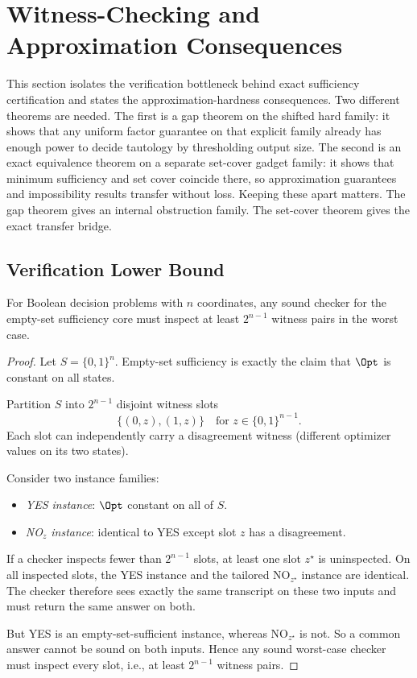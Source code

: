 \section{Witness-Checking and Approximation Consequences}\label{sec:witness-duality}

This section isolates the verification bottleneck behind exact sufficiency certification and states the approximation-hardness consequences. Two different theorems are needed. The first is a gap theorem on the shifted hard family: it shows that any uniform factor guarantee on that explicit family already has enough power to decide tautology by thresholding output size. The second is an exact equivalence theorem on a separate set-cover gadget family: it shows that minimum sufficiency and set cover coincide there, so approximation guarantees and impossibility results transfer without loss. Keeping these apart matters. The gap theorem gives an internal obstruction family. The set-cover theorem gives the exact transfer bridge.

\subsection{Verification Lower Bound}

\begin{theorem}\label{thm:witness-lower-bound-4}
For Boolean decision problems with $n$ coordinates, any sound checker for the empty-set sufficiency core must inspect at least $2^{n-1}$ witness pairs in the worst case.
\end{theorem}

\begin{proof}
Let $S=\{0,1\}^n$. Empty-set sufficiency is exactly the claim that $\Opt$ is constant on all states.

Partition $S$ into $2^{n-1}$ disjoint witness slots
\[
\{(0,z),(1,z)\}\quad\text{for }z\in\{0,1\}^{n-1}.
\]
Each slot can independently carry a disagreement witness (different optimizer values on its two states).

Consider two instance families:
\begin{itemize}
\item \emph{YES instance}: $\Opt$ constant on all of $S$.
\item \emph{NO$_z$ instance}: identical to YES except slot $z$ has a disagreement.
\end{itemize}

If a checker inspects fewer than $2^{n-1}$ slots, at least one slot $z^\star$ is uninspected. On all inspected slots, the YES instance and the tailored NO$_{z^\star}$ instance are identical. The checker therefore sees exactly the same transcript on these two inputs and must return the same answer on both.

But YES is an empty-set-sufficient instance, whereas NO$_{z^\star}$ is not. So a common answer cannot be sound on both inputs. Hence any sound worst-case checker must inspect every slot, i.e., at least $2^{n-1}$ witness pairs.
\end{proof}

